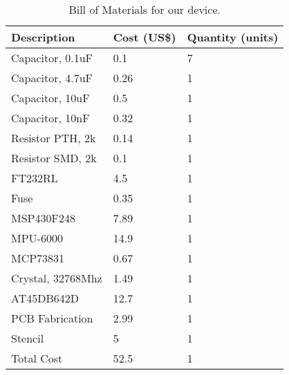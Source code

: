 \begin{table}[h]
\centering
\begin{tabular}{@{}lll@{}}
\toprule
Description                      & Cost (US\$)                      & Quantity (units)               \\ \midrule
Capacitor, 0.1uF                 & 0.1                       & 7                      \\
Capacitor, 4.7uF                 & 0.26                      & 1                      \\
Capacitor, 10uF                  & 0.5                       & 1                      \\
Capacitor, 10nF                  & 0.32                      & 1                      \\
Resistor PTH, 2k                 & 0.14                      & 1                      \\
Resistor SMD, 2k                 & 0.1                       & 1                      \\
FT232RL                          & 4.5                       & 1                      \\
Fuse	                         & 0.35                      & 1                      \\
MSP430F248                       & 7.89                      & 1                      \\
MPU-6000                         & 14.9                      & 1                      \\
MCP73831                         & 0.67                      & 1                      \\
Crystal, 32768Mhz                & 1.49                      & 1                      \\
AT45DB642D                       & 12.7                      & 1                      \\
PCB Fabrication                  & 2.99                      & 1                      \\
Stencil                          & 5                         & 1                      \\ \midrule
Total Cost & 52.5 &	1\\ \bottomrule
\end{tabular}
\caption{Bill of Materials for our device.}
\label{BomTable}
\end{table}